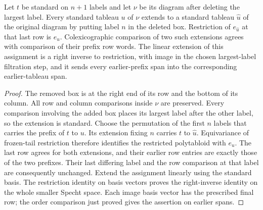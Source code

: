 \begin{lemma}
\label{lem:standard-corner-extension}
\leanok
Let $t$ be standard on $n+1$ labels and let $\nu$ be its diagram
after deleting the largest label. Every standard tableau $u$ of
$\nu$ extends to a standard tableau $\widehat u$ of the original
diagram by putting label $n$ in the deleted box. Restriction of
$e_{\widehat u}$ at that last row is $e_u$. Colexicographic
comparison of two such extensions agrees with comparison of their
prefix row words.
The linear extension of this assignment is a right inverse to
restriction, with image in the chosen largest-label filtration
step, and it sends every earlier-prefix span into the corresponding
earlier-tableau span.
\end{lemma}
\begin{proof}
The removed box is at the right end of its row and the bottom of
its column. All row and column comparisons inside $\nu$ are
preserved. Every comparison involving the added box places its
largest label after the other label, so the extension is standard.
Choose the permutation of the first $n$ labels that carries the
prefix of $t$ to $u$. Its extension fixing $n$ carries $t$ to
$\widehat u$. Equivariance of frozen-tail restriction therefore
identifies the restricted polytabloid with $e_u$. The last row
agrees for both extensions, and their earlier row entries are
exactly those of the two prefixes. Their last differing label and
the row comparison at that label are consequently unchanged.
Extend the assignment linearly using the standard basis. The
restriction identity on basis vectors proves the right-inverse
identity on the whole smaller Specht space. Each image basis
vector has the prescribed final row; the order comparison just
proved gives the assertion on earlier spans.
\end{proof}

